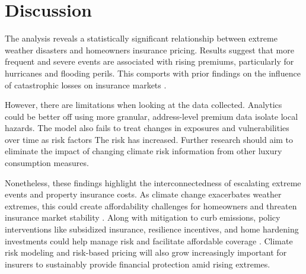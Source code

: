 \documentclass[12pt]{article}
\begin{document}
  


\section{Discussion}
\label{sec:disc}
The analysis reveals a statistically significant relationship between extreme weather disasters and homeowners insurance pricing. 
Results suggest that more frequent and severe events are associated with rising premiums, particularly for hurricanes and flooding 
perils. This comports with prior findings on the influence of catastrophic losses on insurance markets \cite{aon}.

However, there are limitations when looking at the data collected. Analytics could be better off using more granular, address-level 
premium data isolate local hazards. The model also fails to treat changes in exposures and vulnerabilities over time as risk factors
The risk has increased. Further research should aim to eliminate the impact of changing climate risk information from other luxury 
consumption measures.

Nonetheless, these findings highlight the interconnectedness of escalating extreme events and property insurance costs. As climate 
change exacerbates weather extremes, this could create affordability challenges for homeowners and threaten insurance market stability 
\cite{naic}. Along with mitigation to curb emissions, policy interventions like subsidized insurance, resilience incentives, and home 
hardening investments could help manage risk and facilitate affordable coverage \cite{kousky}. Climate risk modeling and risk-based 
pricing will also grow increasingly important for insurers to sustainably provide financial protection amid rising extremes.





\end{document}
